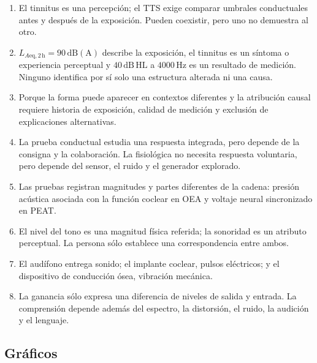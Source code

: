 \begin{enumerate}[label=\textbf{C\arabic*.},leftmargin=*]
    \item El tinnitus es una percepción; el TTS exige comparar umbrales
    conductuales antes y después de la exposición. Pueden coexistir, pero uno
    no demuestra al otro.

    \item \(L_{A\mathrm{eq},2\,\mathrm{h}}=90\,\mathrm{dB(A)}\) describe la exposición,
    el tinnitus es un síntoma o experiencia perceptual y
    \(40\,\mathrm{dB\,HL}\) a \(4000\,\mathrm{Hz}\) es un resultado de
    medición. Ninguno identifica por sí solo una estructura alterada ni una
    causa.

    \item Porque la forma puede aparecer en contextos diferentes y la
    atribución causal requiere historia de exposición, calidad de medición y
    exclusión de explicaciones alternativas.

    \item La prueba conductual estudia una respuesta integrada, pero depende de
    la consigna y la colaboración. La fisiológica no necesita respuesta
    voluntaria, pero depende del sensor, el ruido y el generador explorado.

    \item Las pruebas registran magnitudes y partes diferentes de la cadena:
    presión acústica asociada con la función coclear en OEA y voltaje neural
    sincronizado en PEAT.

    \item El nivel del tono es una magnitud física referida; la sonoridad es un
    atributo perceptual. La persona sólo establece una correspondencia entre
    ambos.

    \item El audífono entrega sonido; el implante coclear, pulsos eléctricos;
    y el dispositivo de conducción ósea, vibración mecánica.

    \item La ganancia sólo expresa una diferencia de niveles de salida y
    entrada. La comprensión depende además del espectro, la distorsión, el
    ruido, la audición y el lenguaje.
\end{enumerate}

\subsection*{Gráficos}


